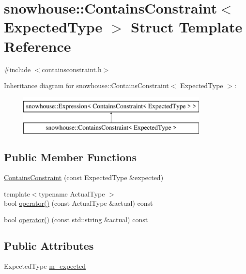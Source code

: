 \hypertarget{structsnowhouse_1_1ContainsConstraint}{}\section{snowhouse\+::Contains\+Constraint$<$ Expected\+Type $>$ Struct Template Reference}
\label{structsnowhouse_1_1ContainsConstraint}


{\ttfamily \#include $<$containsconstraint.\+h$>$}

Inheritance diagram for snowhouse\+::Contains\+Constraint$<$ Expected\+Type $>$\+:\begin{figure}[H]
\begin{center}
\leavevmode
\includegraphics[height=2.000000cm]{structsnowhouse_1_1ContainsConstraint}
\end{center}
\end{figure}
\subsection*{Public Member Functions}
\begin{DoxyCompactItemize}
\item 
\mbox{\hyperlink{structsnowhouse_1_1ContainsConstraint_a090933abc6ca69daeb0027c5d1b9bfb1}{Contains\+Constraint}} (const Expected\+Type \&expected)
\item 
{\footnotesize template$<$typename Actual\+Type $>$ }\\bool \mbox{\hyperlink{structsnowhouse_1_1ContainsConstraint_a019dd604cbe08be692fa05e7f9ffded0}{operator()}} (const Actual\+Type \&actual) const
\item 
bool \mbox{\hyperlink{structsnowhouse_1_1ContainsConstraint_acc3f33607111c0145dde4b8aef55b80a}{operator()}} (const std\+::string \&actual) const
\end{DoxyCompactItemize}
\subsection*{Public Attributes}
\begin{DoxyCompactItemize}
\item 
Expected\+Type \mbox{\hyperlink{structsnowhouse_1_1ContainsConstraint_a2012e122db77fc38ca3af0fc6bfb1915}{m\+\_\+expected}}
\end{DoxyCompactItemize}


